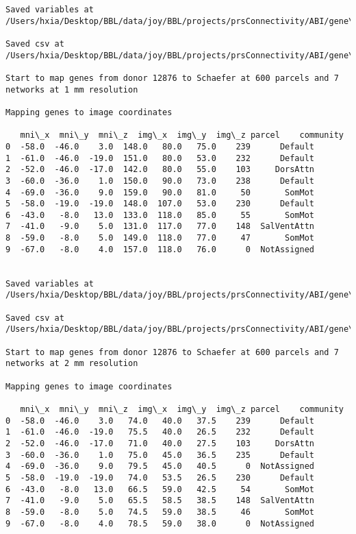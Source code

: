 \documentclass[11pt]{article}
\begin{document}
\begin{Verbatim}[commandchars=\\\{\}]
Saved variables at /Users/hxia/Desktop/BBL/data/joy/BBL/projects/prsConnectivity/ABI/gene\_mapping/12876donor\_400Parcels\_17Network\_2mm.pkl

Saved csv at /Users/hxia/Desktop/BBL/data/joy/BBL/projects/prsConnectivity/ABI/gene\_mapping/12876donor\_400Parcels\_17Network\_2mm.csv

Start to map genes from donor 12876 to Schaefer at 600 parcels and 7 networks at 1 mm resolution

Mapping genes to image coordinates

   mni\_x  mni\_y  mni\_z  img\_x  img\_y  img\_z parcel    community
0  -58.0  -46.0    3.0  148.0   80.0   75.0    239      Default
1  -61.0  -46.0  -19.0  151.0   80.0   53.0    232      Default
2  -52.0  -46.0  -17.0  142.0   80.0   55.0    103     DorsAttn
3  -60.0  -36.0    1.0  150.0   90.0   73.0    238      Default
4  -69.0  -36.0    9.0  159.0   90.0   81.0     50       SomMot
5  -58.0  -19.0  -19.0  148.0  107.0   53.0    230      Default
6  -43.0   -8.0   13.0  133.0  118.0   85.0     55       SomMot
7  -41.0   -9.0    5.0  131.0  117.0   77.0    148  SalVentAttn
8  -59.0   -8.0    5.0  149.0  118.0   77.0     47       SomMot
9  -67.0   -8.0    4.0  157.0  118.0   76.0      0  NotAssigned


Saved variables at /Users/hxia/Desktop/BBL/data/joy/BBL/projects/prsConnectivity/ABI/gene\_mapping/12876donor\_600Parcels\_7Network\_1mm.pkl

Saved csv at /Users/hxia/Desktop/BBL/data/joy/BBL/projects/prsConnectivity/ABI/gene\_mapping/12876donor\_600Parcels\_7Network\_1mm.csv

Start to map genes from donor 12876 to Schaefer at 600 parcels and 7 networks at 2 mm resolution

Mapping genes to image coordinates

   mni\_x  mni\_y  mni\_z  img\_x  img\_y  img\_z parcel    community
0  -58.0  -46.0    3.0   74.0   40.0   37.5    239      Default
1  -61.0  -46.0  -19.0   75.5   40.0   26.5    232      Default
2  -52.0  -46.0  -17.0   71.0   40.0   27.5    103     DorsAttn
3  -60.0  -36.0    1.0   75.0   45.0   36.5    235      Default
4  -69.0  -36.0    9.0   79.5   45.0   40.5      0  NotAssigned
5  -58.0  -19.0  -19.0   74.0   53.5   26.5    230      Default
6  -43.0   -8.0   13.0   66.5   59.0   42.5     54       SomMot
7  -41.0   -9.0    5.0   65.5   58.5   38.5    148  SalVentAttn
8  -59.0   -8.0    5.0   74.5   59.0   38.5     46       SomMot
9  -67.0   -8.0    4.0   78.5   59.0   38.0      0  NotAssigned



\end{Verbatim}
\end{document}

